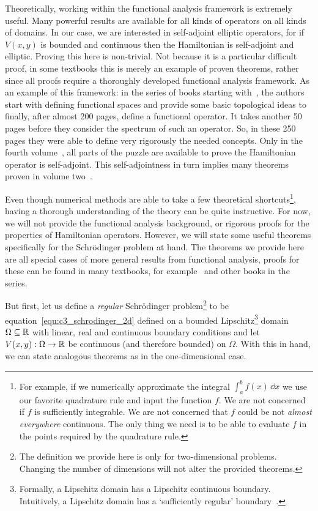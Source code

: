 Theoretically, working within the functional analysis framework is extremely useful. Many powerful results are available for all kinds of operators on all kinds of domains. In our case, we are interested in self-adjoint elliptic operators, for if $V(x, y)$ is bounded and continuous then the Hamiltonian is self-adjoint and elliptic. Proving this here is non-trivial. Not because it is a particular difficult proof, in some textbooks this is merely an example of proven theorems, rather since all proofs require a thoroughly developed functional analysis framework. As an example of this framework: in the series of books starting with~\cite{reed_functional_1980}, the authors start with defining functional spaces and provide some basic topological ideas to finally, after almost 200 pages, define a functional operator. It takes another 50 pages before they consider the spectrum of such an operator. So, in these 250 pages they were able to define very rigorously the needed concepts. Only in the fourth volume~\cite{reed_iv_1978}, all parts of the puzzle are available to prove the Hamiltonian operator is self-adjoint. This self-adjointness in turn implies many theorems proven in volume two~\cite{reed_ii_1975}.

Even though numerical methods are able to take a few theoretical shortcuts\footnote{For example, if we numerically approximate the integral $\int_a^b f(x)\,\dd x$ we use our favorite quadrature rule and input the function $f$. We are not concerned if $f$ is sufficiently integrable. We are not concerned that $f$ could be not \emph{almost everywhere} continuous. The only thing we need is to be able to evaluate $f$ in the points required by the quadrature rule.}, having a thorough understanding of the theory can be quite instructive. For now, we will not provide the functional analysis background, or rigorous proofs for the properties of Hamiltonian operators. However, we will state some useful theorems specifically for the Schrödinger problem at hand. The theorems we provide here are all special cases of more general results from functional analysis, proofs for these can be found in many textbooks, for example~\cite{reed_functional_1980} and other books in the series.

But first, let us define a \emph{regular} Schrödinger problem\footnote{The definition we provide here is only for two-dimensional problems. Changing the number of dimensions will not alter the provided theorems.} to be equation~\eqref{equ:c3_schrodinger_2d} defined on a bounded Lipschitz\footnote{Formally, a Lipschitz domain has a Lipschitz continuous boundary. Intuitively, a Lipschitz domain has a `sufficiently regular' boundary~\cite{dacorogna_introduction_2008}.} domain $\Omega \subseteq \mathbb{R}$ with linear, real and continuous boundary conditions and let $V(x, y) : \Omega \to \mathbb{R}$ be continuous (and therefore bounded) on $\Omega$. With this in hand, we can state analogous theorems as in the one-dimensional case.

